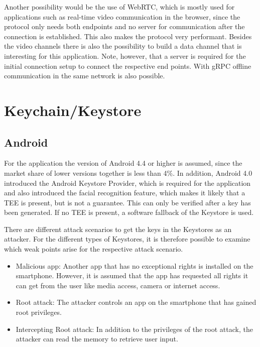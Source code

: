 \documentclass[12pt,oneside,a4paper,parskip]{scrbook}
\begin{document}
Another possibility would be the use of WebRTC, which is mostly used for applications such as real-time video communication in the browser, since the protocol only needs both endpoints and no server for communication after the connection is established. This also makes the protocol very performant. Besides the video channels there is also the possibility to build a data channel that is interesting for this application.  Note, however, that a server is required for the initial connection setup to connect the respective end points. With gRPC offline communication in the same network is also possible. \parencite{3cx_webrtc_nodate}

\section{Keychain/Keystore}
\subsection{Android}
For the application the version of Android 4.4 or higher is assumed, since the market share of lower versions together is less than 4\%. \parencite{google_distribution_2019} \newline
In addition, Android 4.0 introduced the Android Keystore Provider, which is required for the application and also introduced the facial recognition feature, which makes it likely that a TEE is present, but is not a guarantee. This can only be verified after a key has been generated. If no TEE is present, a software fallback of the Keystore is used. \parencite{cooijmans_analysis_2014}


There are different attack scenarios to get the keys in the Keystores as an attacker. For the different types of Keystores, it is therefore possible to examine which weak points arise for the respective attack scenario. 
\begin{itemize}
    \item Malicious app: Another app that has no exceptional rights is installed on the smartphone. However, it is assumed that the app has requested all rights it can get from the user like media access, camera or internet access.
    \item Root attack: The attacker controls an app on the smartphone that has gained root privileges. 
    \item Intercepting Root attack: In addition to the privileges of the root attack, the attacker can read the memory to retrieve user input. 
\end{itemize}
\end{document}
